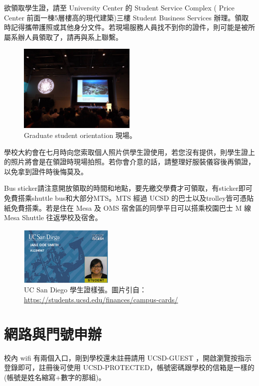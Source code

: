\documentclass[10pt,a4paper]{book}
\begin{document}
\begin{CJK}{UTF8}{bkai}
欲領取學生證，請至 University Center 的 Student Service Complex ( Price Center 前面一棟5層樓高的現代建築)三樓 Student Business Services 辦理。領取時記得攜帶護照或其他身分文件。若現場服務人員找不到你的證件，則可能是被所屬系辦人員領取了，請再與系上聯繫。

\begin{figure}
\centering
\includegraphics[width=0.5\textwidth]{Pics/orientation}
\caption{Graduate student orientation 現場。}
\end{figure}

學校大約會在七月時向您索取個人照片供學生證使用，若您沒有提供，則學生證上的照片將會是在領證時現場拍照。若你會介意的話，請整理好服裝儀容後再領證，以免拿到證件時後悔莫及。

Bus sticker請注意開放領取的時間和地點，要先繳交學費才可領取，有sticker即可免費搭乘shuttle bus和大部分MTS。MTS 經過 UCSD 的巴士以及trolley皆可憑貼紙免費搭乘。若是住在 Mesa 及 OMS 宿舍區的同學平日可以搭乘校園巴士 M 線 Mesa Shuttle 往返學校及宿舍。

\begin{figure}
\centering
\includegraphics[width=0.4\textwidth]{Pics/studentid}
\caption{UC San Diego 學生證樣張。圖片引自：\url{https://students.ucsd.edu/finances/campus-cards/}}
\end{figure}


\section{網路與門號申辦}

校內 wifi 有兩個入口，剛到學校還未註冊請用 UCSD-GUEST ，開啟瀏覽按指示登錄即可，註冊後可使用 UCSD-PROTECTED，帳號密碼跟學校的信箱是一樣的(帳號是姓名縮寫+數字的那組)。


\end{CJK}
\end{document}
